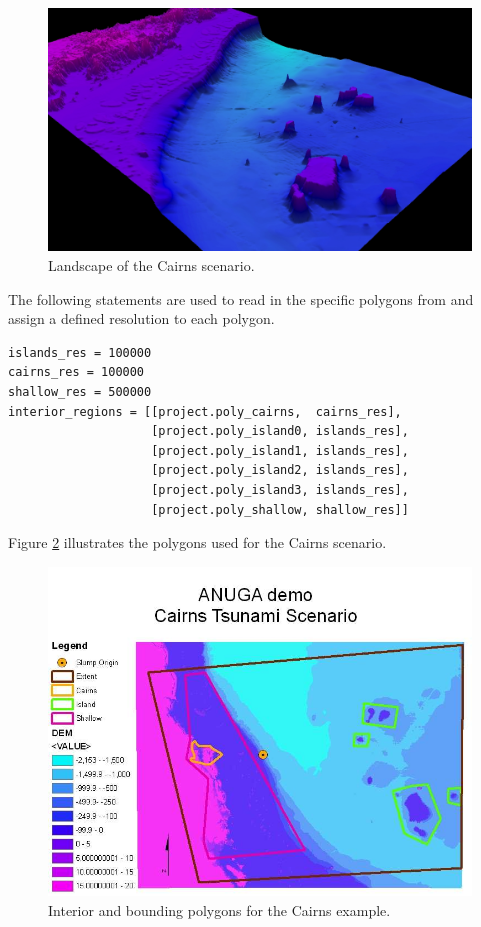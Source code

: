 \documentclass{manual}
\begin{document}
\clearpage

\begin{figure}[htp]
  \centerline{\includegraphics[scale=0.5]{graphics/cairns3.jpg}}
  \caption{Landscape of the Cairns scenario.}
  \label{fig:cairns3d}
\end{figure}

The following statements are used to read in the specific polygons
from  and assign a defined resolution to
each polygon.

\begin{verbatim}
islands_res = 100000
cairns_res = 100000
shallow_res = 500000
interior_regions = [[project.poly_cairns,  cairns_res],
                    [project.poly_island0, islands_res],
                    [project.poly_island1, islands_res],
                    [project.poly_island2, islands_res],
                    [project.poly_island3, islands_res],
                    [project.poly_shallow, shallow_res]]
\end{verbatim}

Figure \ref{fig:cairnspolys}
illustrates the polygons used for the Cairns scenario.

\clearpage

\begin{figure}[htp]
  \centerline{\includegraphics[scale=0.5]
      {graphics/cairnsmodel.jpg}}
  \caption{Interior and bounding polygons for the Cairns example.}
  \label{fig:cairnspolys}
\end{figure}
\end{document}
